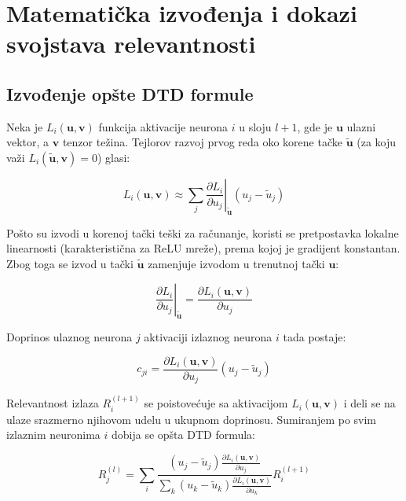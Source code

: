 \section{Matematička izvođenja i dokazi svojstava relevantnosti}

\subsection{Izvođenje opšte DTD formule}
\label{appendix:deep_taylor}

Neka je $L_i(\mathbf{u}, \mathbf{v})$ funkcija aktivacije neurona $i$ u sloju $l+1$, gde je $\mathbf{u}$ ulazni vektor, a $\mathbf{v}$ tenzor težina. Tejlorov razvoj prvog reda oko korene tačke $\tilde{\mathbf{u}}$ (za koju važi $L_i(\tilde{\mathbf{u}}, \mathbf{v}) = 0$) glasi:

\begin{equation*}
    L_i(\mathbf{u}, \mathbf{v}) \approx \sum_j \left. \frac{\partial L_i}{\partial u_j} \right|_{\tilde{\mathbf{u}}} (u_j - \tilde{u}_j)
\end{equation*}

Pošto su izvodi u korenoj tački teški za računanje, koristi se pretpostavka lokalne linearnosti (karakteristična za ReLU mreže), prema kojoj je gradijent konstantan. Zbog toga se izvod u tački $\tilde{\mathbf{u}}$ zamenjuje izvodom u trenutnoj tački $\mathbf{u}$:

\begin{equation*}
    \left. \frac{\partial L_i}{\partial u_j} \right|_{\tilde{\mathbf{u}}} = \frac{\partial L_i(\mathbf{u}, \mathbf{v})}{\partial u_j}
\end{equation*}

Doprinos ulaznog neurona $j$ aktivaciji izlaznog neurona $i$ tada postaje:

\begin{equation*}
    c_{ji} = \frac{\partial L_i(\mathbf{u}, \mathbf{v})}{\partial u_j} (u_j - \tilde{u}_j)
\end{equation*}

Relevantnost izlaza $R_i^{(l+1)}$ se poistovećuje sa aktivacijom $L_i(\mathbf{u}, \mathbf{v})$ i deli se na ulaze srazmerno njihovom udelu u ukupnom doprinosu. Sumiranjem po svim izlaznim neuronima $i$ dobija se opšta DTD formula:

\begin{equation*}
    R_j^{(l)} = \sum_i \frac{(u_j - \tilde{u}_j) \frac{\partial L_i(\mathbf{u}, \mathbf{v})}{\partial u_j}}{\sum_k (u_k - \tilde{u}_k) \frac{\partial L_i(\mathbf{u}, \mathbf{v})}{\partial u_k}} R_i^{(l+1)}
\end{equation*}


